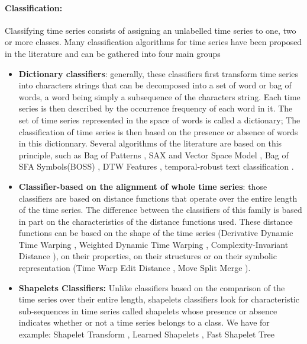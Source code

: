 \paragraph{Classification:}
Classifying time series consists of assigning an unlabelled time series to one, two or more classes. Many classification algorithms for time series have been proposed in the literature and can be gathered into four main groups
\begin{itemize}
\item \textbf{Dictionary classifiers}: generally, these classifiers first transform time series into characters strings that can be decomposed into a set of word or bag of words, a word being simply a subsequence of the characters string. Each time series is then described by the occurrence frequency of each word in it. The set of time series represented in the space of words is called a dictionary; The classification of time series is then based on the presence or absence of words in this dictionnary. Several algorithms of the literature are based on this principle, such as Bag of Patterns \cite{lin2012rotation},  SAX and Vector Space Model \cite{senin2013sax}, Bag of SFA Symbols(BOSS) \cite{schafer2015boss}, DTW Features \cite{kate2016using}, temporal-robust text classification \cite{salles2017two} .

\item \textbf{Classifier-based on the alignment of whole time series}: those classifiers are based on distance functions that operate over the entire length of the time series. The difference between the classifiers of this family is based in part on the characteristics of the distance functions used. These distance functions can be based on the shape of the time series (Derivative Dynamic Time Warping  \cite{keogh2001derivative}, Weighted Dynamic Time Warping  \cite{jeong2011weighted}, Complexity-Invariant Distance  \cite{batista2011complexity}), on their properties, on their structures or on their symbolic representation (Time Warp Edit Distance \cite{marteau2008time}, Move Split Merge \cite{stefan2013move}).

\item \textbf{Shapelets Classifiers:}  Unlike classifiers based on the comparison of the time series over their entire length, shapelets classifiers look for characteristic sub-sequences in time series called shapelets whose presence or absence indicates whether or not a time series belongs to a class. We have for example: Shapelet Transform \cite{lines2012shapelet}, Learned Shapelets \cite{grabocka2014learning}, Fast Shapelet Tree \cite{rakthanmanon2013fast}


\end{itemize}
